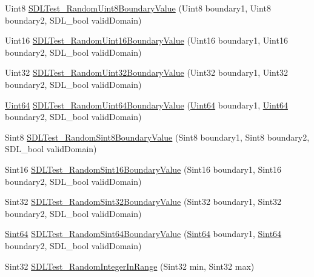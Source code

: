 \begin{DoxyCompactItemize}
\item 
Uint8 \hyperlink{x86__64-w64-mingw32_2include_2SDL2_2SDL__test__fuzzer_8h_a129a58a37dc23847b8257569bf56d16f}{S\+D\+L\+Test\+\_\+\+Random\+Uint8\+Boundary\+Value} (Uint8 boundary1, Uint8 boundary2, S\+D\+L\+\_\+bool valid\+Domain)
\item 
Uint16 \hyperlink{x86__64-w64-mingw32_2include_2SDL2_2SDL__test__fuzzer_8h_a3710dba14db764872949252f558429ba}{S\+D\+L\+Test\+\_\+\+Random\+Uint16\+Boundary\+Value} (Uint16 boundary1, Uint16 boundary2, S\+D\+L\+\_\+bool valid\+Domain)
\item 
Uint32 \hyperlink{x86__64-w64-mingw32_2include_2SDL2_2SDL__test__fuzzer_8h_a9e718145eaf96f611cd67fc530473e3a}{S\+D\+L\+Test\+\_\+\+Random\+Uint32\+Boundary\+Value} (Uint32 boundary1, Uint32 boundary2, S\+D\+L\+\_\+bool valid\+Domain)
\item 
\hyperlink{structUint64}{Uint64} \hyperlink{x86__64-w64-mingw32_2include_2SDL2_2SDL__test__fuzzer_8h_abc660d9b04554c8c2717325224b88b6a}{S\+D\+L\+Test\+\_\+\+Random\+Uint64\+Boundary\+Value} (\hyperlink{structUint64}{Uint64} boundary1, \hyperlink{structUint64}{Uint64} boundary2, S\+D\+L\+\_\+bool valid\+Domain)
\item 
Sint8 \hyperlink{x86__64-w64-mingw32_2include_2SDL2_2SDL__test__fuzzer_8h_a09ec06adf1ca58afa5283be6b4f5fdfc}{S\+D\+L\+Test\+\_\+\+Random\+Sint8\+Boundary\+Value} (Sint8 boundary1, Sint8 boundary2, S\+D\+L\+\_\+bool valid\+Domain)
\item 
Sint16 \hyperlink{x86__64-w64-mingw32_2include_2SDL2_2SDL__test__fuzzer_8h_ae11fb12560b1a9180b1645d6ca1c6af6}{S\+D\+L\+Test\+\_\+\+Random\+Sint16\+Boundary\+Value} (Sint16 boundary1, Sint16 boundary2, S\+D\+L\+\_\+bool valid\+Domain)
\item 
Sint32 \hyperlink{x86__64-w64-mingw32_2include_2SDL2_2SDL__test__fuzzer_8h_ab17fbfddfa253bb3d64412000488fc07}{S\+D\+L\+Test\+\_\+\+Random\+Sint32\+Boundary\+Value} (Sint32 boundary1, Sint32 boundary2, S\+D\+L\+\_\+bool valid\+Domain)
\item 
\hyperlink{structUint64}{Sint64} \hyperlink{x86__64-w64-mingw32_2include_2SDL2_2SDL__test__fuzzer_8h_a0b6a8004aba7d72595f80540fa0b6727}{S\+D\+L\+Test\+\_\+\+Random\+Sint64\+Boundary\+Value} (\hyperlink{structUint64}{Sint64} boundary1, \hyperlink{structUint64}{Sint64} boundary2, S\+D\+L\+\_\+bool valid\+Domain)
\item 
Sint32 \hyperlink{x86__64-w64-mingw32_2include_2SDL2_2SDL__test__fuzzer_8h_a5c81f42e213ad1608cf5f29669eb8521}{S\+D\+L\+Test\+\_\+\+Random\+Integer\+In\+Range} (Sint32 min, Sint32 max)

\end{DoxyCompactItemize}
